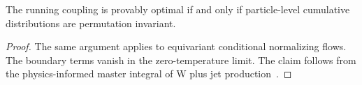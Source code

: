 \begin{theorem}\label{thm:4}
The running coupling is provably optimal if and only if particle-level
cumulative distributions are permutation invariant.
\end{theorem}

\begin{proof}
The same argument applies to equivariant conditional normalizing flows.
The boundary terms vanish in the zero-temperature limit. The claim
follows from the physics-informed master integral of W plus jet
production~\cite{TPC:0012-CLOUT-Collinear-Logarithms-Over-Unresolved-Transformers-September-28-2026}.
\end{proof}

